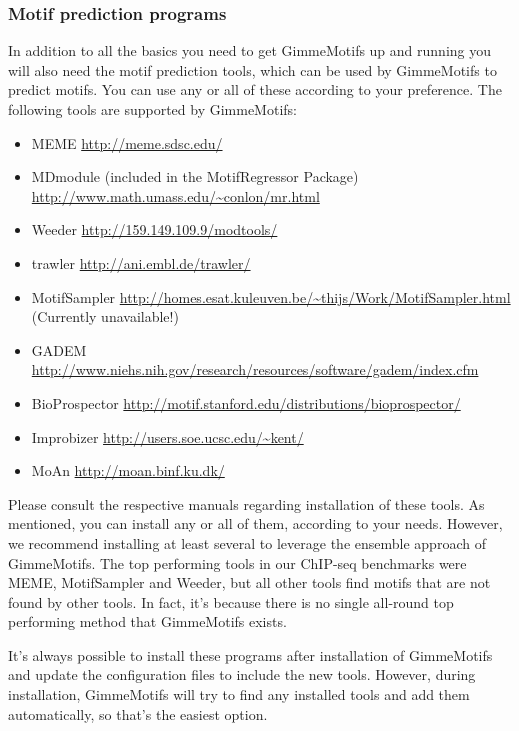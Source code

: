 \documentclass[10pt]{article}
\begin{document}
\subsubsection{Motif prediction programs}
In addition to all the basics you need to get GimmeMotifs up and running you will also need the motif prediction tools, which can be used by GimmeMotifs to predict motifs. You can use any or all of these according to your preference. The following tools are supported by GimmeMotifs:
\begin{itemize}
\item MEME \cite{bailey_meme_2009} \url{http://meme.sdsc.edu/}
\item MDmodule \cite{liu_algorithm_2002} (included in the MotifRegressor
Package) \url{http://www.math.umass.edu/~conlon/mr.html}
\item Weeder \cite{pavesi_weeder_2004} \url{http://159.149.109.9/modtools/}
\item trawler \cite{ettwiller_trawler:_2007} \url{http://ani.embl.de/trawler/}
\item MotifSampler \cite{thijs_higher-order_2001} \url{http://homes.esat.kuleuven.be/~thijs/Work/MotifSampler.html} (Currently unavailable!)
\item GADEM \cite{li_gadem:genetic_2009} \url{http://www.niehs.nih.gov/research/resources/software/gadem/index.cfm}
\item BioProspector \cite{liu_bioprospector:_2001} \url{http://motif.stanford.edu/distributions/bioprospector/}
\item Improbizer \cite{ao_environmentally_2004} \url{http://users.soe.ucsc.edu/~kent/}
\item MoAn \cite{valen_discovery_2009} \url{http://moan.binf.ku.dk/}
\end{itemize}
Please consult the respective manuals regarding installation of these tools. As mentioned, you can install any or all of them, according to your needs. However, we recommend installing at least several to leverage the ensemble approach of GimmeMotifs. The top performing tools in our ChIP-seq benchmarks were MEME, MotifSampler and Weeder, but all other tools find motifs that are not found by other tools. In fact, it's because there is no single all-round top performing method that GimmeMotifs exists. 

It's always possible to install these programs after installation of GimmeMotifs and update the configuration files to include the new tools. However, during installation, GimmeMotifs will try to find any installed tools and add them automatically, so that's the easiest option.
\end{document}
